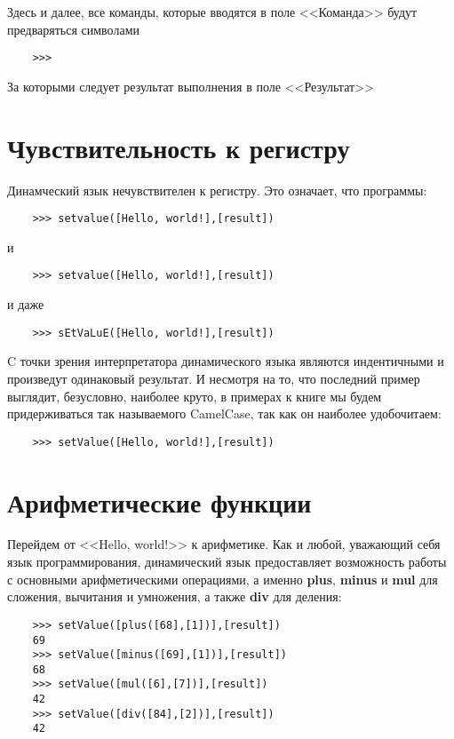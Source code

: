 \documentclass[10pt]{book}
\begin{document}
	Здесь и далее, все команды, которые вводятся в поле <<Команда>> будут предваряться символами 	\begin{verbatim}
	>>>
	\end{verbatim}	За которыми следует результат выполнения в поле <<Результат>>
	
	\section{Чувствительность к регистру}
	
	Динамческий язык нечувствителен к регистру. Это означает, что программы:
	
	\begin{verbatim}
	>>> setvalue([Hello, world!],[result])
	\end{verbatim}
	
	и
	
	\begin{verbatim}
	>>> setvalue([Hello, world!],[result])
	\end{verbatim}
	
	и даже
	
	\begin{verbatim}
	>>> sEtVaLuE([Hello, world!],[result])
	\end{verbatim}
	
	C точки зрения интерпретатора динамического языка являются индентичными и произведут одинаковый результат. И несмотря на то, что последний пример выглядит, безусловно, наиболее круто, в примерах к книге мы будем придерживаться так называемого CamelCase, так как он наиболее удобочитаем:
	
	\begin{verbatim}
	>>> setValue([Hello, world!],[result])
	\end{verbatim}
	
	\section{Арифметические функции}
	
	Перейдем от <<Hello, world!>> к арифметике. Как и любой, уважающий себя язык программирования, динамический язык предоставляет возможность работы с основными арифметическими операциями, а именно {\bf plus}, {\bf minus} и {\bf mul} для сложения, вычитания и умножения, а также {\bf div} для деления:
	
	\begin{verbatim}
	>>> setValue([plus([68],[1])],[result])
	69
	>>> setValue([minus([69],[1])],[result])
	68
	>>> setValue([mul([6],[7])],[result])
	42
	>>> setValue([div([84],[2])],[result])
	42
	\end{verbatim}
	
\end{document}
